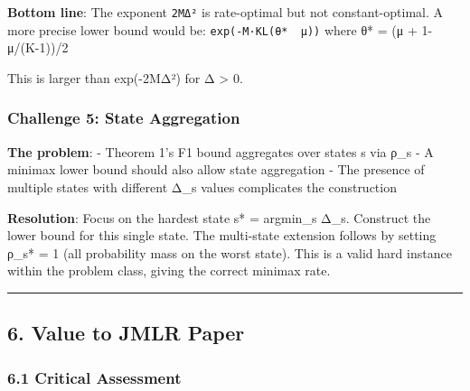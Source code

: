 \documentclass[
  12pt,
]{ctexart}
\begin{document}
\textbf{Bottom line}: The exponent \texttt{2MΔ²} is rate-optimal but not
constant-optimal. A more precise lower bound would be:
\texttt{exp(-M·KL(θ*\ \textbar{}\textbar{}\ μ))} where θ* = (μ +
1-μ/(K-1))/2

This is larger than exp(-2MΔ²) for Δ \textgreater{} 0.

\subsubsection{Challenge 5: State
Aggregation}\label{challenge-5-state-aggregation}

\textbf{The problem}: - Theorem 1's F1 bound aggregates over states s
via ρ\_s - A minimax lower bound should also allow state aggregation -
The presence of multiple states with different Δ\_s values complicates
the construction

\textbf{Resolution}: Focus on the hardest state s* = argmin\_s Δ\_s.
Construct the lower bound for this single state. The multi-state
extension follows by setting ρ\_s* = 1 (all probability mass on the
worst state). This is a valid hard instance within the problem class,
giving the correct minimax rate.

\begin{center}\rule{0.5\linewidth}{0.5pt}\end{center}

\subsection{6. Value to JMLR Paper}\label{value-to-jmlr-paper}

\subsubsection{6.1 Critical Assessment}\label{critical-assessment}
\end{document}
